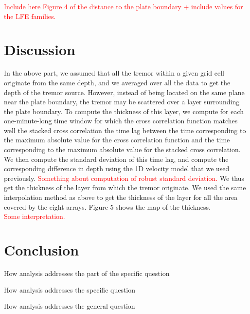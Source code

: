 \documentclass[draft]{agujournal2019}
\begin{document}
\textcolor{red}{Include here Figure 4 of the distance to the plate boundary + include values for the LFE families.} \\

\section{Discussion}

In the above part, we assumed that all the tremor within a given grid cell originate from the same depth, and we averaged over all the data to get the depth of the tremor source. However, instead of being located on the same plane near the plate boundary, the tremor may be scattered over a layer surrounding the plate boundary. To compute the thickness of this layer, we compute for each one-minute-long time window for which the cross correlation function matches well the stacked cross correlation the time lag between the time corresponding to the maximum absolute value for the cross correlation function and the time corresponding to the maximum absolute value for the stacked cross correlation. We then compute the standard deviation of this time lag, and compute the corresponding difference in depth using the 1D velocity model that we used previously.   \textcolor{red}{Something about computation of robust standard deviation.} We thus get the thickness of the layer from which the tremor originate. We used the same interpolation method as above to get the thickness of the layer for all the area covered by the eight arrays. Figure 5 shows the map of the thickness. \\

\textcolor{red}{Some interpretation.}

\section{Conclusion}

How analysis addresses the part of the specific question

How analysis addresses the specific question

How analysis addresses the general question




\end{document}
